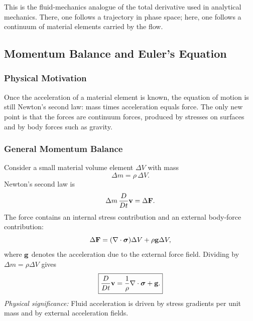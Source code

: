 \documentclass[../main.tex]{subfiles}
\begin{document}
This is the fluid-mechanics analogue of the total derivative used in analytical mechanics. There, one follows a trajectory in phase space; here, one follows a continuum of material elements carried by the flow.

\subsection{Momentum Balance and Euler's Equation}\label{sec:lec12:euler}

\subsubsection*{Physical Motivation}
Once the acceleration of a material element is known, the equation of motion is still Newton's second law: mass times acceleration equals force. The only new point is that the forces are continuum forces, produced by stresses on surfaces and by body forces such as gravity.

\subsubsection{General Momentum Balance}\label{subsec:lec12:general-momentum}
Consider a small material volume element $\Delta V$ with mass
\begin{equation}
  \Delta m=\rho\,\Delta V.
  \label{eq:lec12_mass_element}
\end{equation}
Newton's second law is
\begin{equation}
  \Delta m\,\frac{D}{Dt}\mathbf{v}=\Delta\mathbf{F}.
  \label{eq:lec12_newton_element}
\end{equation}
The force contains an internal stress contribution and an external body-force contribution:
\begin{equation}
  \Delta\mathbf{F}
  =
  (\nabla \cdot\boldsymbol{\sigma})\Delta V
  +
  \rho\mathbf{g}\Delta V,
  \label{eq:lec12_force_decomposition}
\end{equation}
where $\mathbf{g}$ denotes the acceleration due to the external force field. Dividing by $\Delta m=\rho\Delta V$ gives
\begin{equation}
  \boxed{
  \frac{D}{Dt}\mathbf{v}
  =
  \frac{1}{\rho}\nabla \cdot\boldsymbol{\sigma}+\mathbf{g}.}
  \label{eq:lec12_general_momentum}
\end{equation}
\textit{Physical significance:} Fluid acceleration is driven by stress gradients per unit mass and by external acceleration fields.
\end{document}
